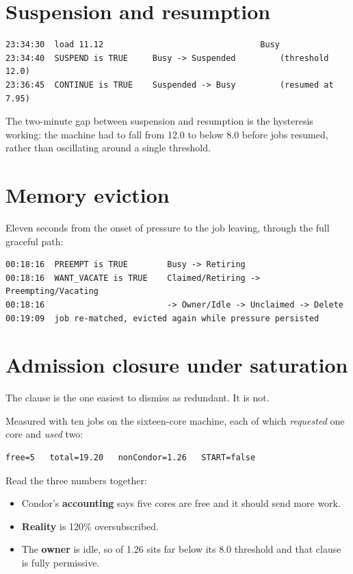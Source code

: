 \section{Suspension and resumption}
\label{sec:obs-suspend}

\begin{lstlisting}[style=term]
23:34:30  load 11.12                                Busy
23:34:40  SUSPEND is TRUE     Busy -> Suspended         (threshold 12.0)
23:36:45  CONTINUE is TRUE    Suspended -> Busy         (resumed at 7.95)
\end{lstlisting}

The two-minute gap between suspension and resumption is the hysteresis working:
the machine had to fall from 12.0 to below 8.0 before jobs resumed, rather than
oscillating around a single threshold.

\section{Memory eviction}
\label{sec:obs-evict}

Eleven seconds from the onset of pressure to the job leaving, through the full
graceful path:

\begin{lstlisting}[style=term]
00:18:16  PREEMPT is TRUE        Busy -> Retiring
00:18:16  WANT_VACATE is TRUE    Claimed/Retiring -> Preempting/Vacating
00:18:16                         -> Owner/Idle -> Unclaimed -> Delete
00:19:09  job re-matched, evicted again while pressure persisted
\end{lstlisting}

\section{Admission closure under saturation}
\label{sec:closure}

The clause  is the one easiest to dismiss as
redundant. It is not.

Measured with ten jobs on the sixteen-core machine, each of which
\emph{requested} one core and \emph{used} two:

\begin{lstlisting}[style=term]
free=5   total=19.20   nonCondor=1.26   START=false
\end{lstlisting}

Read the three numbers together:

\begin{itemize}
  \item Condor's \textbf{accounting} says five cores are free and it should send
        more work.
  \item \textbf{Reality} is 120\% oversubscribed.
  \item The \textbf{owner} is idle, so  of 1.26 sits far below
        its 8.0 threshold and that clause is fully permissive.
\end{itemize}

